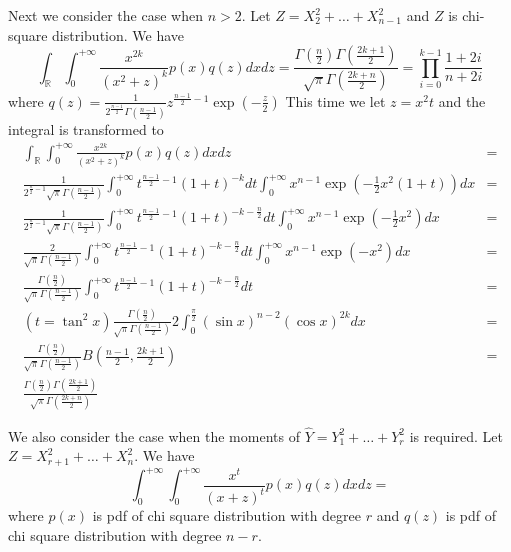 \documentclass{article}
\def\R{\mathbb{R}}
\begin{document}
Next we consider the case when $n>2$. Let $Z = X_2^2 + \dots + X_{n-1}^2$ and $Z$ is chi-square distribution. We have
\begin{equation}\label{eq:n3}
\int_{\R}\int_{0}^{+\infty} \frac{x^{2k}}{(x^2+z)^k} p(x)q(z)dxdz = \frac{\Gamma(\frac{n}{2}) \Gamma(\frac{2k+1}{2})}{\sqrt{\pi} \Gamma(\frac{2k+n}{2})} = \prod_{i=0}^{k-1} \frac{1+2i}{n+2i}
\end{equation}
where $q(z) = \frac{1}{2^{\frac{n-1}{2}}\Gamma(\frac{n-1}{2})} z ^{\frac{n-1}{2} - 1} \exp(-\frac{z}{2})$
This time we let $z=x^2 t$ and the integral is transformed to 
\begin{align*}
\int_{\R}\int_{0}^{+\infty} \frac{x^{2k}}{(x^2+z)^k} p(x)q(z)dxdz & = \\
\frac{1}{2^{\frac{n}{2}-1}\sqrt{\pi}\Gamma(\frac{n-1}{2})} \int_{0}^{+\infty}t^{\frac{n-1}{2}-1}(1+t)^{-k}dt\int_{0}^{+\infty}x^{n-1} \exp(-\frac{1}{2}x^2(1+t)) dx &=
\\
\frac{1}{2^{\frac{n}{2}-1}\sqrt{\pi}\Gamma(\frac{n-1}{2})} \int_{0}^{+\infty}t^{\frac{n-1}{2}-1}(1+t)^{-k-\frac{n}{2}}dt\int_{0}^{+\infty}x^{n-1} \exp(-\frac{1}{2}x^2) dx &=
\\
\frac{2}{\sqrt{\pi}\Gamma(\frac{n-1}{2})} \int_{0}^{+\infty}t^{\frac{n-1}{2}-1}(1+t)^{-k-\frac{n}{2}}dt\int_{0}^{+\infty}x^{n-1} \exp(-x^2) dx &=
\\
\frac{\Gamma(\frac{n}{2})}{\sqrt{\pi}\Gamma(\frac{n-1}{2})} \int_{0}^{+\infty}t^{\frac{n-1}{2}-1}(1+t)^{-k-\frac{n}{2}}dt
&= \\ (t=\tan^2 x) \frac{\Gamma(\frac{n}{2})}{\sqrt{\pi}\Gamma(\frac{n-1}{2})} 2 \int_0^{\frac{\pi}{2}} (\sin x)^{n-2} (\cos x)^{2k} dx 
&= \\ \frac{\Gamma(\frac{n}{2})}{\sqrt{\pi}\Gamma(\frac{n-1}{2})} B(\frac{n-1}{2}, \frac{2k+1}{2})
&= \\ \frac{\Gamma(\frac{n}{2}) \Gamma(\frac{2k+1}{2})}{\sqrt{\pi} \Gamma(\frac{2k+n}{2})}
\end{align*}

We also consider the case when the moments of $\hat{Y} = Y_1^2 + \dots + Y_r^2$ is required. Let $Z = X_{r+1}^2 + \dots + X_n^2$. We have 
\begin{equation}\label{eq:n4}
\int_{0}^{+\infty}\int_{0}^{+\infty} \frac{x^t}{(x+z)^t} p(x)q(z) dxdz = 
\end{equation}
where $p(x)$ is pdf of chi square distribution with degree $r$ and $q(z)$ is pdf of chi square distribution with degree $n-r$.
\end{document}
